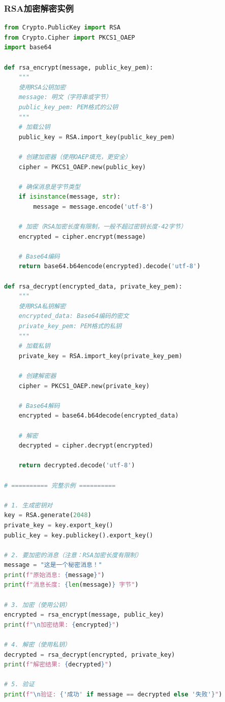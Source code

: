 \documentclass[12pt,a4paper]{article}
\begin{document}
\subsubsection{RSA加密解密实例}

\begin{lstlisting}[language=Python]
from Crypto.PublicKey import RSA
from Crypto.Cipher import PKCS1_OAEP
import base64

def rsa_encrypt(message, public_key_pem):
    """
    使用RSA公钥加密
    message: 明文（字符串或字节）
    public_key_pem: PEM格式的公钥
    """
    # 加载公钥
    public_key = RSA.import_key(public_key_pem)
    
    # 创建加密器（使用OAEP填充，更安全）
    cipher = PKCS1_OAEP.new(public_key)
    
    # 确保消息是字节类型
    if isinstance(message, str):
        message = message.encode('utf-8')
    
    # 加密（RSA加密长度有限制，一般不超过密钥长度-42字节）
    encrypted = cipher.encrypt(message)
    
    # Base64编码
    return base64.b64encode(encrypted).decode('utf-8')

def rsa_decrypt(encrypted_data, private_key_pem):
    """
    使用RSA私钥解密
    encrypted_data: Base64编码的密文
    private_key_pem: PEM格式的私钥
    """
    # 加载私钥
    private_key = RSA.import_key(private_key_pem)
    
    # 创建解密器
    cipher = PKCS1_OAEP.new(private_key)
    
    # Base64解码
    encrypted = base64.b64decode(encrypted_data)
    
    # 解密
    decrypted = cipher.decrypt(encrypted)
    
    return decrypted.decode('utf-8')

# ========== 完整示例 ==========

# 1. 生成密钥对
key = RSA.generate(2048)
private_key = key.export_key()
public_key = key.publickey().export_key()

# 2. 要加密的消息（注意：RSA加密长度有限制）
message = "这是一个秘密消息！"
print(f"原始消息: {message}")
print(f"消息长度: {len(message)} 字节")

# 3. 加密（使用公钥）
encrypted = rsa_encrypt(message, public_key)
print(f"\n加密结果: {encrypted}")

# 4. 解密（使用私钥）
decrypted = rsa_decrypt(encrypted, private_key)
print(f"解密结果: {decrypted}")

# 5. 验证
print(f"\n验证: {'成功' if message == decrypted else '失败'}")
\end{lstlisting}
\end{document}
